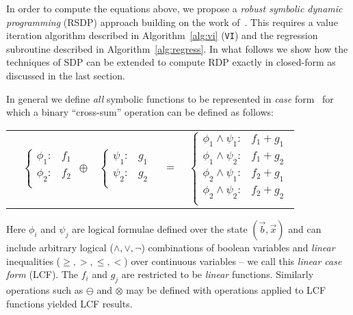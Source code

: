 In order to compute the equations above, we propose a \emph{robust
symbolic dynamic programming} (RSDP) approach building on the
work of~\cite{sdp_aaai,sanner_uai11}.  This requires a value iteration
algorithm described in Algorithm~\ref{alg:vi} (\texttt{VI}) and the
regression subroutine described in Algorithm~\ref{alg:regress}.  In what
follows we show how the techniques of SDP can be extended to compute RDP
exactly in closed-form as discussed in the last section.

In general we define \emph{all} symbolic functions to be represented
in \emph{case} form~\cite{fomdp} for which a binary ``cross-sum'' operation
can be defined as follows:
{\footnotesize 
\begin{center}
\begin{tabular}{r c c c l}
&
\hspace{-6mm} 
  $\begin{cases}
    \phi_1: & f_1 \\ 
    \phi_2: & f_2 \\ 
  \end{cases}$
$\oplus$
&
\hspace{-4mm}
  $\begin{cases}
    \psi_1: & g_1 \\ 
    \psi_2: & g_2 \\ 
  \end{cases}$
&
\hspace{-2mm} 
$ = $
&
\hspace{-2mm}
  $\begin{cases}
  \phi_1 \wedge \psi_1: & f_1 + g_1 \\ 
  \phi_1 \wedge \psi_2: & f_1 + g_2 \\ 
  \phi_2 \wedge \psi_1: & f_2 + g_1 \\ 
  \phi_2 \wedge \psi_2: & f_2 + g_2 \\ 
  \end{cases}$
\end{tabular}
\end{center}
}
\normalsize
Here $\phi_i$ and $\psi_j$ are logical formulae defined over the state
$(\vec{b},\vec{x})$ and can include arbitrary logical
($\land,\lor,\neg$) combinations of boolean variables
and \emph{linear} inequalities ($\geq,>,\leq,<$) over continuous
variables -- we call this \emph{linear case form} (LCF).  The $f_i$
and $g_j$ are restricted to be \emph{linear} functions.  Similarly
operations such as $\ominus$ and $\otimes$ may be defined with operations
applied to LCF functions yielded LCF results.

